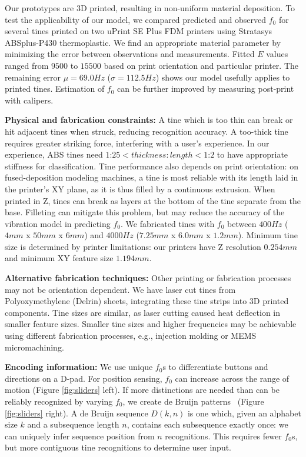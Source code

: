 Our prototypes are 3D printed, resulting in non-uniform material deposition. To test the applicability of our model, we compared predicted and observed $f_0$ for several tines printed on two uPrint SE Plus FDM printers using Stratasys ABSplus-P430 thermoplastic. We find an appropriate material parameter by minimizing the error between observations and measurements. Fitted $E$ values ranged from $9500$ to $15500$ based on print orientation and particular printer.  The remaining error $\mu= 69.0Hz$ ($\sigma= 112.5Hz$) shows our model usefully applies to printed tines. Estimation of $f_0$ can be further improved by measuring post-print with calipers.

\textbf{Physical and fabrication constraints:} A tine which is too thin can break or hit adjacent tines when struck, reducing recognition accuracy.  A too-thick tine requires greater striking force, interfering with a user's experience.
In our experience, ABS tines need $1$:$25 < thickness:length < 1$:$2$ to have appropriate stiffness for classification.  Tine performance also depends on print orientation: on fused-deposition modeling machines, a tine is most reliable with its length laid in the printer's XY plane, as it is thus filled by a continuous extrusion.  
When printed in Z, tines can break as layers at the bottom of the tine separate from the base.
Filleting can mitigate this problem, but may reduce the accuracy of the vibration model in predicting $f_0$.  We fabricated tines with $f_0$ between $400Hz$ ($4mm$ x $50mm$ x $6mm$) and $4000Hz$ ($7.25mm$ x $6.0mm$ x $1.2mm$).  
Minimum tine size is determined by printer limitations: our printers have Z resolution $0.254mm$ and minimum XY feature size $1.194mm$.

\textbf{Alternative fabrication techniques:} Other printing or fabrication processes may not be orientation dependent.
We have laser cut tines from Polyoxymethylene (Delrin) sheets, integrating these tine strips into 3D printed components.  Tine sizes are similar, as laser cutting caused heat deflection in smaller feature sizes. Smaller tine sizes and higher frequencies may be achievable using different fabrication processes, e.g., injection molding or MEMS micromachining.

\textbf{Encoding information:} We use unique $f_0$s to differentiate buttons and directions on a D-pad.
For position sensing, $f_0$ can increase across the range of motion (Figure \ref{fig:sliders} left). If more distinctions are needed than can be reliably recognized by varying $f_0$, we create de Bruijn patterns~\cite{DeBruijn-seqproof} (Figure \ref{fig:sliders} right).  A de Bruijn sequence $D(k,n)$ is one which, given an alphabet size $k$ and a subsequence length $n$, contains each subsequence exactly once: we can uniquely infer sequence position from $n$ recognitions.
This requires fewer $f_0$s, but more contiguous tine recognitions to determine user input.


